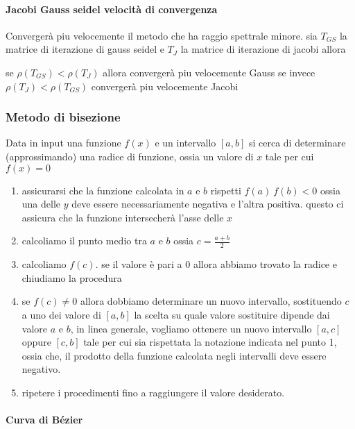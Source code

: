 \documentclass[
]{article}
\begin{document}
\paragraph{Jacobi Gauss seidel velocità di
convergenza}\label{jacobi-gauss-seidel-velocituxe0-di-convergenza}

Convergerà piu velocemente il metodo che ha raggio spettrale minore. sia
\(T_{GS}\) la matrice di iterazione di gauss seidel e \(T_{J}\) la
matrice di iterazione di jacobi allora

se \(\rho(T_{GS})<\rho(T_{J})\) allora convergerà piu velocemente Gauss
se invece \(\rho(T_{J})<\rho(T_{GS})\) convergerà piu velocemente Jacobi

\subsubsection{Metodo di bisezione}\label{metodo-di-bisezione}

Data in input una funzione \(f(x)\) e un intervallo \([a,b]\) si cerca
di determinare (approssimando) una radice di funzione, ossia un valore
di \(x\) tale per cui \(f(x) = 0\)

\begin{enumerate}
\def\labelenumi{\arabic{enumi}.}
\item
  assicurarsi che la funzione calcolata in \(a\) e \(b\) rispetti
  \(f(a) \ f(b) < 0\) ossia una delle \(y\) deve essere necessariamente
  negativa e l'altra positiva. questo ci assicura che la funzione
  intersecherà l'asse delle \(x\)
\item
  calcoliamo il punto medio tra \(a\) e \(b\) ossia
  \(c = \frac{a+b}{2}\)
\item
  calcoliamo \(f(c)\). se il valore è pari a \(0\) allora abbiamo
  trovato la radice e chiudiamo la procedura
\item
  se \(f(c) \neq 0\) allora dobbiamo determinare un nuovo intervallo,
  sostituendo \(c\) a uno dei valore di \([a,b]\) la scelta su quale
  valore sostituire dipende dai valore \(a\) e \(b\), in linea generale,
  vogliamo ottenere un nuovo intervallo \([a,c]\) oppure \([c,b]\) tale
  per cui sia rispettata la notazione indicata nel punto 1, ossia che,
  il prodotto della funzione calcolata negli intervalli deve essere
  negativo.
\item
  ripetere i procedimenti fino a raggiungere il valore desiderato.
\end{enumerate}

\paragraph{Curva di Bézier}\label{curva-di-buxe9zier}
\end{document}
